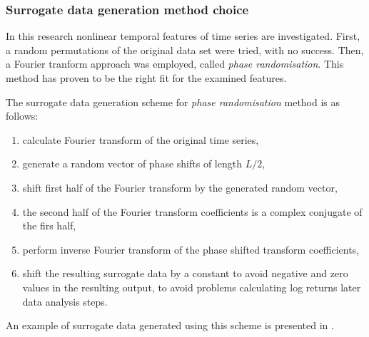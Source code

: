 \subsubsection{Surrogate data generation method choice} \label{sec:surrogate-method}
In this research nonlinear temporal features of time series are investigated.
First, a random permutations of the original data set were tried, with no success.
Then, a Fourier tranform approach was employed, called \emph{phase randomisation}.
This method has proven to be the right fit for the examined features.

The surrogate data generation scheme for \emph{phase randomisation} method is as follows:
\begin{enumerate}
    \item calculate Fourier transform of the original time series,
    \item generate a random vector of phase shifts of length $L/2$,
    \item shift first half of the Fourier transform by the generated random vector,
    \item the second half of the Fourier transform coefficients is a complex conjugate of the firs half,
    \item perform inverse Fourier transform of the phase shifted transform coefficients,
    \item shift the resulting surrogate data by a constant to avoid negative and zero values in the resulting output, to avoid problems calculating log returns later data analysis steps.
\end{enumerate}

An example of surrogate data generated using this scheme is presented in .
